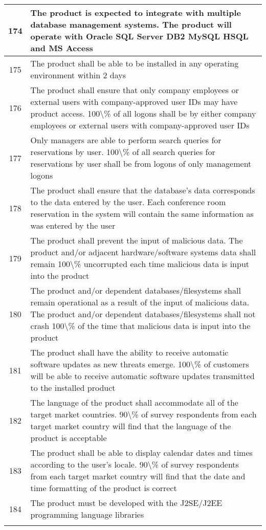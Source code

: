 \begin{table}
{\begin{tabularx}{\textwidth}{cX}
    174   & The product is expected to integrate with multiple database management systems. The product will operate with Oracle SQL Server DB2 MySQL HSQL and MS Access \\    \midrule
    175   & The product shall be able to be installed in any operating environment within 2 days \\    \midrule
    176   & The product shall ensure that only company employees or external users with company-approved user IDs may have product access. 100\textbackslash{}\% of all logons shall be by either company employees or external users with company-approved user IDs \\    \midrule
    177   & Only managers are able to perform search queries for reservations by user. 100\textbackslash{}\% of all search queries for reservations by user shall be from logons of only management logons \\    \midrule
    178   & The product shall ensure that the database's data corresponds to the data entered by the user. Each conference room reservation in the system will contain the same information as was entered by the user \\    \midrule
    179   & The product shall prevent the input of malicious data. The product and/or adjacent hardware/software systems data shall remain 100\textbackslash{}\% uncorrupted each time malicious data is input into the product \\    \midrule
    180   & The product and/or dependent databases/filesystems shall remain operational as a result of the input of malicious data. The product and/or dependent databases/filesystems shall not crash 100\textbackslash{}\% of the time that malicious data is input into the product \\    \midrule
    181   & The product shall have the ability to receive automatic software updates as new threats emerge. 100\textbackslash{}\% of customers will be able to receive automatic software updates transmitted to the installed product \\    \midrule
    182   & The language of the product shall accommodate all of the target market countries. 90\textbackslash{}\% of survey respondents from each target market country will find that the language of the product is acceptable \\    \midrule
    183   & The product shall be able to display calendar dates and times according to the user's locale. 90\textbackslash{}\% of survey respondents from each target market country will find that the date and time formatting of the product is correct \\    \midrule
    184   & The product must be developed with the J2SE/J2EE programming language libraries \\
    
    \addlinespace
    \bottomrule
    \end{tabularx}
}
\end{table}